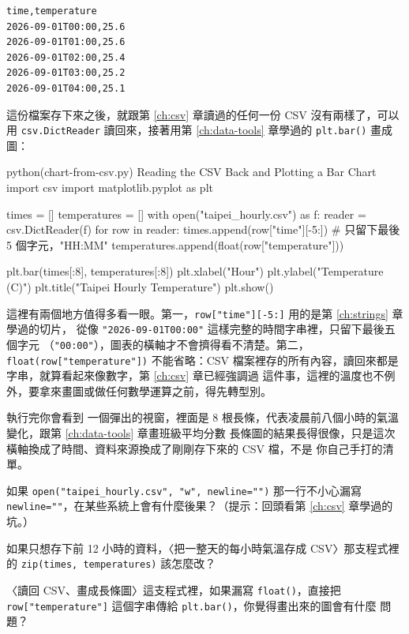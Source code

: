 \begin{verbatim}
time,temperature
2026-09-01T00:00,25.6
2026-09-01T01:00,25.6
2026-09-01T02:00,25.4
2026-09-01T03:00,25.2
2026-09-01T04:00,25.1
\end{verbatim}

這份檔案存下來之後，就跟第 \ref{ch:csv} 章讀過的任何一份 CSV 沒有兩樣了，可以用
\texttt{csv.DictReader} 讀回來，接著用第 \ref{ch:data-tools} 章學過的 \texttt{plt.bar()} 畫成圖：

\begin{example}{python}{(chart-from-csv.py) Reading the CSV Back and Plotting a Bar Chart}
import csv
import matplotlib.pyplot as plt

times = []
temperatures = []
with open("taipei_hourly.csv") as f:
    reader = csv.DictReader(f)
    for row in reader:
        times.append(row["time"][-5:])            # 只留下最後 5 個字元，"HH:MM"
        temperatures.append(float(row["temperature"]))

plt.bar(times[:8], temperatures[:8])
plt.xlabel("Hour")
plt.ylabel("Temperature (C)")
plt.title("Taipei Hourly Temperature")
plt.show()
\end{example}

這裡有兩個地方值得多看一眼。第一，\texttt{row["time"][-5:]} 用的是第 \ref{ch:strings} 章學過的切片，
從像 \texttt{"2026-09-01T00:00"} 這樣完整的時間字串裡，只留下最後五個字元
（\texttt{"00:00"}），圖表的橫軸才不會擠得看不清楚。第二，\texttt{float(row["temperature"])}
不能省略：CSV 檔案裡存的所有內容，讀回來都是字串，就算看起來像數字，第 \ref{ch:csv} 章已經強調過
這件事，這裡的溫度也不例外，要拿來畫圖或做任何數學運算之前，得先轉型別。

執行完你會看到
一個彈出的視窗，裡面是 8 根長條，代表凌晨前八個小時的氣溫變化，跟第 \ref{ch:data-tools} 章畫班級平均分數
長條圖的結果長得很像，只是這次橫軸換成了時間、資料來源換成了剛剛存下來的 CSV 檔，不是
你自己手打的清單。

\begin{drills}[label=drills:save-and-chart]
\item 如果 \texttt{open("taipei\_hourly.csv", "w", newline="")} 那一行不小心漏寫
\texttt{newline=""}，在某些系統上會有什麼後果？（提示：回頭看第 \ref{ch:csv} 章學過的坑。）
\item 如果只想存下前 12 小時的資料，〈把一整天的每小時氣溫存成 CSV〉那支程式裡的
\texttt{zip(times, temperatures)} 該怎麼改？
\item 〈讀回 CSV、畫成長條圖〉這支程式裡，如果漏寫 \texttt{float()}，直接把
\texttt{row["temperature"]} 這個字串傳給 \texttt{plt.bar()}，你覺得畫出來的圖會有什麼
問題？
\end{drills}


